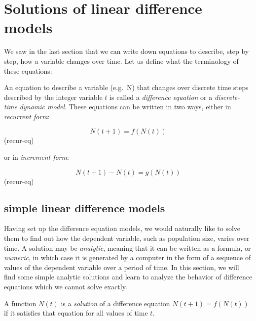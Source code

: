 \documentclass[
  letterpaper,
  DIV=11,
  numbers=noendperiod]{scrreprt}
\begin{document}
\hypertarget{solutions-of-linear-difference-models}{%
\section{Solutions of linear difference
models}\label{solutions-of-linear-difference-models}}

We saw in the last section that we can write down equations to describe,
step by step, how a variable changes over time. Let us define what the
terminology of these equations:

\begin{tcolorbox}[enhanced jigsaw, colbacktitle=quarto-callout-note-color!10!white, leftrule=.75mm, coltitle=black, left=2mm, breakable, opacityback=0, colback=white, toprule=.15mm, opacitybacktitle=0.6, bottomtitle=1mm, colframe=quarto-callout-note-color-frame, rightrule=.15mm, bottomrule=.15mm, toptitle=1mm, titlerule=0mm, arc=.35mm, title=\textcolor{quarto-callout-note-color}{\faInfo}\hspace{0.5em}{Definition}]
An equation to describe a variable (e.g.~N) that changes over discrete
time steps described by the integer variable \(t\) is called a
\emph{difference equation} or a \emph{discrete-time dynamic model}.
These equations can be written in two ways, either in \emph{recurrent
form}:

\[
N(t+1) = f(N(t))
\] (recur-eq)

or in \emph{increment form}:

\[
N(t+1) - N(t) = g(N(t))
\] (recur-eq)
\end{tcolorbox}

\hypertarget{simple-linear-difference-models}{%
\subsection{simple linear difference
models}\label{simple-linear-difference-models}}

Having set up the difference equation models, we would naturally like to
solve them to find out how the dependent variable, such as population
size, varies over time. A solution may be \emph{analytic}, meaning that
it can be written as a formula, or \emph{numeric}, in which case it is
generated by a computer in the form of a sequence of values of the
dependent variable over a period of time. In this section, we will find
some simple analytic solutions and learn to analyze the behavior of
difference equations which we cannot solve exactly.

\begin{tcolorbox}[enhanced jigsaw, colbacktitle=quarto-callout-note-color!10!white, leftrule=.75mm, coltitle=black, left=2mm, breakable, opacityback=0, colback=white, toprule=.15mm, opacitybacktitle=0.6, bottomtitle=1mm, colframe=quarto-callout-note-color-frame, rightrule=.15mm, bottomrule=.15mm, toptitle=1mm, titlerule=0mm, arc=.35mm, title=\textcolor{quarto-callout-note-color}{\faInfo}\hspace{0.5em}{Definition}]
A function \(N(t)\) is a \emph{solution} of a difference equation
\(N(t+1) = f(N(t))\) if it satisfies that equation for all values of
time \(t\).
\end{tcolorbox}
\end{document}
